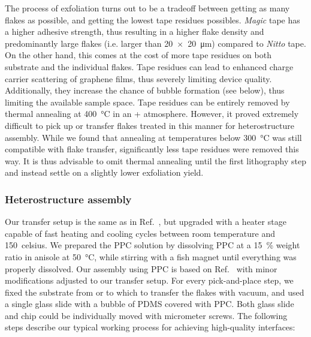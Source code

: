 The process of exfoliation turns out to be a tradeoff between getting as many flakes as possible, and getting the lowest tape residues possibles.
% 
\textit{Magic} tape has a higher adhesive strength, thus resulting in a higher flake density and predominantly large flakes (i.e. larger than \SI{20x20}{\micro\meter}) compared to \textit{Nitto} tape.
% 
On the other hand, this comes at the cost of more tape residues on both substrate and the individual flakes.
% 
Tape residues can lead to enhanced charge carrier scattering of graphene films, thus severely limiting device quality.
% 
Additionally, they increase the chance of bubble formation (see below), thus limiting the available sample space.
% 
Tape residues can be entirely removed by thermal annealing at \SI{400}{\celsius} in  an + atmosphere.
% 
However, it proved extremely difficult to pick up or transfer flakes treated in this manner for heterostructure assembly.
% 
While we found that annealing at temperatures below \SI{300}{\celsius} was still compatible with flake transfer, significantly less tape residues were removed this way.
% 
It is thus advisable to omit thermal annealing until the first lithography step and instead settle on a slightly lower exfoliation yield.

\subsubsection{Heterostructure assembly}

Our transfer setup is the same as in Ref.~\cite{castellanos-gomezDeterministicTransferTwodimensional2014d}, but upgraded with a heater stage capable of fast heating and cooling cycles between room temperature and \SI{150}{celsius}.
% 
We prepared the PPC solution by dissolving PPC at a \SI{15}{\percent} weight ratio in anisole at \SI{50}{\celsius}, while stirring with a fish magnet until everything was properly dissolved.
% 
Our assembly using PPC is based on Ref.~\cite{pizzoccheroHotPickupTechnique2016a} with minor modifications adjusted to our transfer setup.
% 
For every pick-and-place step, we fixed the substrate from or to which to transfer the flakes with vacuum, and used a single glass slide with a bubble of PDMS covered with PPC.
%
Both glass slide and chip could be individually moved with micrometer screws.
%
The following steps describe our typical working process for achieving high-quality interfaces:

